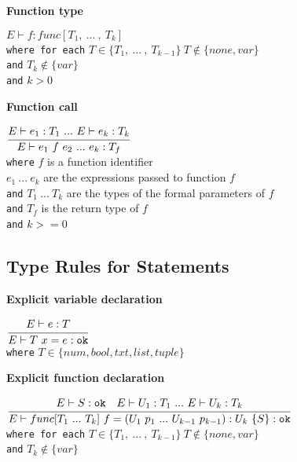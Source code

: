 \textbf{Function type}\\
\begin{center}
	\begin{math}
	E \vdash f : func[T_1,\ .
	.
	.
	\ ,\ T_k]
	\end{math}
	\\[1\baselineskip]
	\texttt{where for each} $T \in \{T_1,\ .
	.
	.
	\ ,\ T_{k-1}\}\ T \notin \{none, var\}$\\
	\texttt{and} $T_k \notin \{var\}$\\
	\texttt{and} $k > 0$
\end{center}

\textbf{Function call}\\
\begin{center}
	\begin{math}
		\cfrac
		{E \vdash e_1 : T_1 \ .
		.
		.
		\ E \vdash e_k : T_k}
		{E \vdash e_1\ f\ e_2 \ .
		.
		.
		\ e_k : T_f}
	\end{math}
	\\[1\baselineskip]
	\texttt{where} $f$ is a function identifier\\
	$e_1\ .
	.
	.
	\ e_k$ are the expressions passed to function $f$\\
	\texttt{and} $T_1\ .
	.
	.
	\ T_k$ are the types of the formal parameters of $f$\\
	\texttt{and} $T_f$ is the return type of $f$\\
	\texttt{and} $k >= 0$
\end{center}



\subsection{Type Rules for Statements}
\textbf{Explicit variable declaration}\\
\begin{center}
	\begin{math}
		\cfrac
		{E \vdash e : T}
		{E \vdash T\ x = e : \texttt{ok}}
	\end{math}
	\\[1\baselineskip]
	\texttt{where} $T \in \{num, bool, txt, list, tuple\}$
\end{center}

\textbf{Explicit function declaration}\\
\begin{center}
	\begin{math}
		\cfrac
		{E\vdash S : \texttt{ok}\quad E \vdash U_1 : T_1\
			.
			.
			.
			\ E \vdash U_k : T_k}
		{E \vdash func[T_1\
			.
			.
			.
			\ T_k]\ f = (U_1\ p_1\
			.
			.
			.
			\ U_{k-1}\ p_{k-1}): U_k\ \{ S \} : \texttt{ok}}
	\end{math}
	\\[1\baselineskip]
	\texttt{where for each} $T \in \{T_1,\ .
	.
	.
	\ ,\ T_{k-1}\}\ T \notin \{none, var\}$\\
	\texttt{and} $T_k \notin \{var\}$
\end{center}

